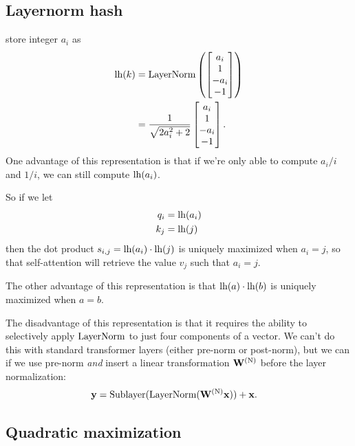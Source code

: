 \subsection{Layernorm hash}

 store integer $a_i$ as
\begin{align*}
  \textnormal{lh}(k) &= \textnormal{LayerNorm}\left(\begin{bmatrix} a_i \\ 1 \\ -a_i \\ -1 \end{bmatrix}\right) \\
  &= \frac1{\sqrt{2a_i^2+2}} \begin{bmatrix} a_i \\ 1 \\ -a_i \\ -1 \end{bmatrix}.
\end{align*}
One advantage of this representation is that if we're only able to compute $a_i/i$ and $1/i$, we can still compute $\textnormal{lh}(a_i)$.

So if we let
\begin{align*}
  q_i &= \textnormal{lh}(a_i) \\
  k_j &= \textnormal{lh}(j)
\end{align*}
then the dot product $s_{i,j} = \textnormal{lh}(a_i) \cdot \textnormal{lh}(j)$ is uniquely maximized when $a_i = j$, so that self-attention will retrieve the value $v_j$ such that $a_i = j$.

The other advantage of this representation is that $\textnormal{lh}(a) \cdot \textnormal{lh}(b)$ is uniquely maximized when $a=b$. 

The disadvantage of this representation is that it requires the ability to selectively apply $\textnormal{LayerNorm}$ to just four components of a vector. We can't do this with standard transformer layers (either pre-norm or post-norm), but we can if we use pre-norm \emph{and} insert a linear transformation $\mathbf{W}^{(\textnormal{N})}$ before the layer normalization:
\begin{align*}
  \mathbf{y} &= \textnormal{Sublayer}(\textnormal{LayerNorm}(\mathbf{W}^{(\textnormal{N})} \mathbf{x})) + \mathbf{x}.
\end{align*}

\subsection{Quadratic maximization}

